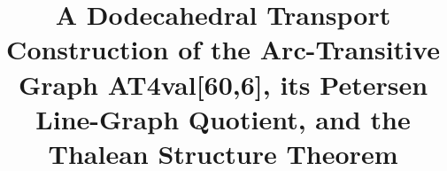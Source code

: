 \title{
A Dodecahedral Transport Construction of the
Arc-Transitive Graph AT4val[60,6],
its Petersen Line-Graph Quotient,
and the Thalean Structure Theorem
}
